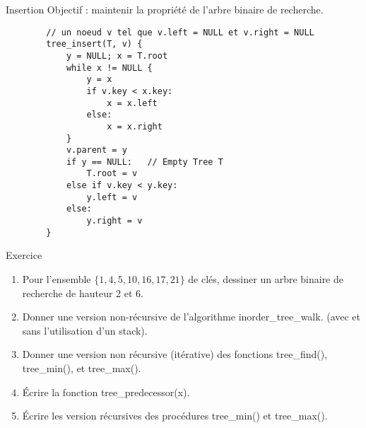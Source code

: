 \documentclass{beamer}
\begin{document}
\lstset{language=c++, basicstyle=\scriptsize, columns=fullflexible}

\begin{frame}[fragile]{Insertion}
    Objectif : maintenir la propriété de l'arbre binaire de recherche.
    \pause
    \begin{lstlisting}
        // un noeud v tel que v.left = NULL et v.right = NULL
        tree_insert(T, v) {
            y = NULL; x = T.root
            while x != NULL {
                y = x
                if v.key < x.key:
                    x = x.left
                else:
                    x = x.right
            }
            v.parent = y
            if y == NULL:   // Empty Tree T
                T.root = v
            else if v.key < y.key:
                y.left = v
            else:
                y.right = v
        }
    \end{lstlisting}
\end{frame}

\begin{frame}[t]{Exercice}
    \begin{enumerate}
        \item Pour l'ensemble $\{1, 4, 5, 10, 16, 17, 21\}$ de clés, dessiner un arbre binaire de recherche de hauteur 2 et 6.
        \item Donner une version non-récursive de l'algorithme inorder\_tree\_walk. (avec et sans l'utilisation d'un stack).
        \item Donner une version non récursive (itérative) des fonctions tree\_find(), tree\_min(), et tree\_max().
        \item Écrire la fonction tree\_predecessor(x).
        \item Écrire les version récursives des procédures tree\_min() et tree\_max().
    \end{enumerate}
\end{frame}
\end{document}
